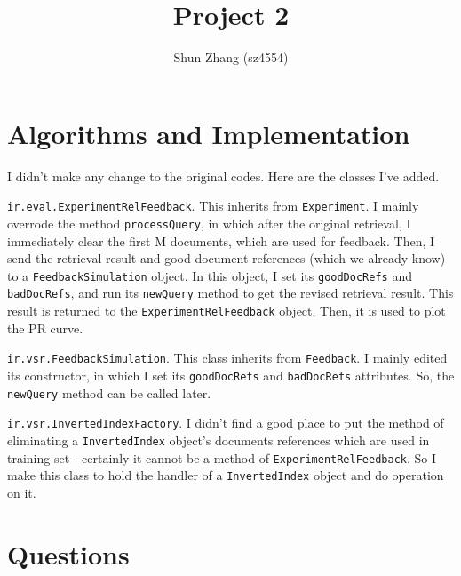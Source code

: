 \documentclass[11pt]{article}
\title{Project 2}
\author{Shun Zhang (sz4554)}
\begin{document}
\maketitle

\section{Algorithms and Implementation}

I didn't make any change to the original codes. Here are the classes I've added.

\texttt{ir.eval.ExperimentRelFeedback}. This inherits from \texttt{Experiment}. I mainly overrode the method \texttt{processQuery}, in which after the original retrieval, I immediately clear the first M documents, which are used for feedback. Then, I send the retrieval result and good document references (which we already know) to a \texttt{FeedbackSimulation} object. In this object, I set its \texttt{goodDocRefs} and \texttt{badDocRefs}, and run its \texttt{newQuery} method to get the revised retrieval result. This result is returned to the \texttt{ExperimentRelFeedback} object. Then, it is used to plot the PR curve.

\texttt{ir.vsr.FeedbackSimulation}. This class inherits from \texttt{Feedback}. I mainly edited its constructor, in which I set its \texttt{goodDocRefs} and \texttt{badDocRefs} attributes. So, the \texttt{newQuery} method can be called later.

\texttt{ir.vsr.InvertedIndexFactory}. I didn't find a good place to put the method of eliminating a \texttt{InvertedIndex} object's documents references which are used in training set - certainly it cannot be a method of \texttt{ExperimentRelFeedback}. So I make this class to hold the handler of a \texttt{InvertedIndex} object and do operation on it.

\section{Questions}
\end{document}
